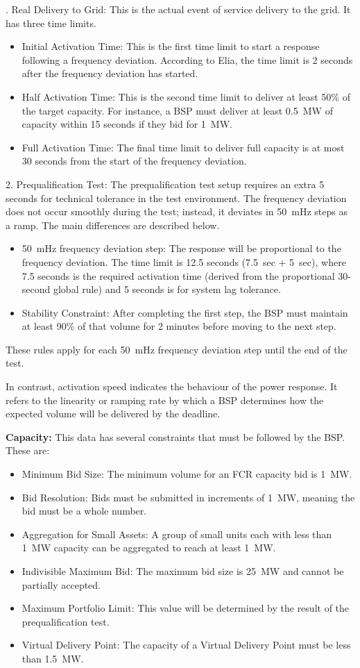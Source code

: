 . Real Delivery to Grid: This is the actual event of service delivery to the grid. It has three time limits.
\begin{itemize}
    \item Initial Activation Time: This is the first time limit to start a response following a frequency deviation. According to Elia, the time limit is 2 seconds after the frequency deviation has started.
    \item Half Activation Time: This is the second time limit to deliver at least 50\% of the target capacity. For instance, a BSP must deliver at least 0.5~MW of capacity within 15 seconds if they bid for 1~MW.
    \item Full Activation Time: The final time limit to deliver full capacity is at most 30 seconds from the start of the frequency deviation.
\end{itemize}
2. Prequalification Test: The prequalification test setup requires an extra 5 seconds for technical tolerance in the test environment. The frequency deviation does not occur smoothly during the test; instead, it deviates in 50~mHz steps as a ramp. The main differences are described below.
\begin{itemize}
    \item 50~mHz frequency deviation step: The response will be proportional to the frequency deviation. The time limit is 12.5 seconds (7.5~sec + 5~sec), where 7.5 seconds is the required activation time (derived from the proportional 30-second global rule) and 5 seconds is for system lag tolerance.
    \item Stability Constraint: After completing the first step, the BSP must maintain at least 90\% of that volume for 2 minutes before moving to the next step.
\end{itemize}
These rules apply for each 50~mHz frequency deviation step until the end of the test.

In contrast, activation speed indicates the behaviour of the power response. It refers to the linearity or ramping rate by which a BSP determines how the expected volume will be delivered by the deadline.

\textbf{Capacity:} This data has several constraints that must be followed by the BSP. These are:
\begin{itemize}
    \item Minimum Bid Size: The minimum volume for an FCR capacity bid is 1~MW.
    \item Bid Resolution: Bids must be submitted in increments of 1~MW, meaning the bid must be a whole number.
    \item Aggregation for Small Assets: A group of small units each with less than 1~MW capacity can be aggregated to reach at least 1~MW.
    \item Indivisible Maximum Bid: The maximum bid size is 25~MW and cannot be partially accepted.
    \item Maximum Portfolio Limit: This value will be determined by the result of the prequalification test.
    \item Virtual Delivery Point: The capacity of a Virtual Delivery Point must be less than 1.5~MW.
\end{itemize}


